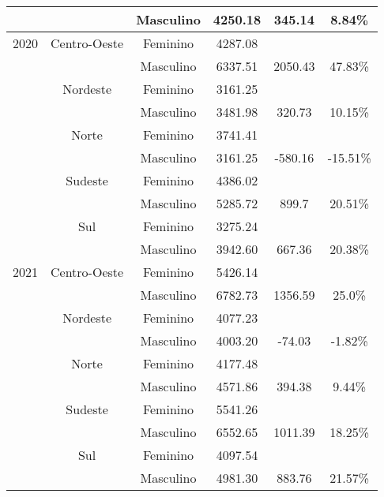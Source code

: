 \begin{table}[htbp]
\begin{center}
\begin{tabular}{|c|c|c|c|c|c|}
			             &                  & Masculino     & 4250.18        & 345.14       & 8.84\%         \\\hline
			2020         & Centro-Oeste     & Feminino      & 4287.08        &              &                \\
			             &                  & Masculino     & 6337.51        & 2050.43      & 47.83\%        \\
			             & Nordeste         & Feminino      & 3161.25        &              &                \\
			             &                  & Masculino     & 3481.98        & 320.73       & 10.15\%        \\
			             & Norte            & Feminino      & 3741.41        &              &                \\
			             &                  & Masculino     & 3161.25        & -580.16      & -15.51\%       \\
			             & Sudeste          & Feminino      & 4386.02        &              &                \\
			             &                  & Masculino     & 5285.72        & 899.7        & 20.51\%        \\
			             & Sul              & Feminino      & 3275.24        &              &                \\
			             &                  & Masculino     & 3942.60        & 667.36       & 20.38\%        \\\hline
			2021         & Centro-Oeste     & Feminino      & 5426.14        &              &                \\
			             &                  & Masculino     & 6782.73        & 1356.59      & 25.0\%         \\
			             & Nordeste         & Feminino      & 4077.23        &              &                \\
			             &                  & Masculino     & 4003.20        & -74.03       & -1.82\%        \\
			             & Norte            & Feminino      & 4177.48        &              &                \\
			             &                  & Masculino     & 4571.86        & 394.38       & 9.44\%         \\
			             & Sudeste          & Feminino      & 5541.26        &              &                \\
			             &                  & Masculino     & 6552.65        & 1011.39      & 18.25\%        \\
			             & Sul              & Feminino      & 4097.54        &              &                \\
			             &                  & Masculino     & 4981.30        & 883.76       & 21.57\%        \\
			\hline
		\end{tabular}
		\label{remunTotal}
	\end{center}
\end{table}

